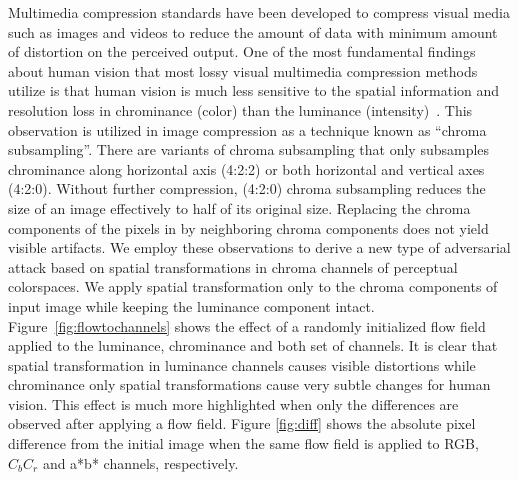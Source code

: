 Multimedia compression standards have been developed to compress visual media such as images and videos to reduce the amount of data with minimum amount of distortion on the perceived output. One of the most fundamental findings about human vision that most lossy visual multimedia compression methods utilize is that human vision is much less sensitive to the spatial information and resolution loss in chrominance (color) than the luminance (intensity)~\cite{vorobyev2004ecology}. This observation is utilized in image compression as a technique known as ``chroma subsampling''. There are variants of chroma subsampling that only subsamples chrominance along horizontal axis (4:2:2) or both horizontal and vertical axes (4:2:0). Without further compression, (4:2:0) chroma subsampling reduces the size of an image effectively to half of its original size. Replacing the chroma components of the pixels in by neighboring chroma components does not yield visible artifacts.
We employ these observations to derive a new type of adversarial attack based on spatial transformations in chroma channels of perceptual colorspaces. We apply spatial transformation only to the chroma components of input image while keeping the luminance component intact. Figure~\ref{fig:flowtochannels} shows the effect of a randomly initialized flow field applied to the luminance, chrominance and both set of channels. It is clear that spatial transformation in luminance channels causes visible distortions while chrominance only spatial transformations cause very subtle changes for human vision. This effect is much more highlighted when only the differences are observed after applying a flow field. Figure \ref{fig:diff} shows the absolute pixel difference from the initial image when the same flow field is applied to RGB, \(C_{b}C_{r}\) and a*b* channels, respectively.

